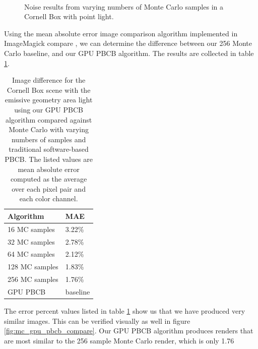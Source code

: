 \begin{figure}
   ~
   \captionfonts
   \caption[Monte Carlo noise]{Noise results from varying numbers of Monte Carlo samples in a Cornell Box with point light.}
   \label{fig:monte_carlo_noise}
\end{figure}

Using the mean absolute error image comparison algorithm implemented in ImageMagick compare \cite{bib:compare}, we can determine the difference between our 256 Monte Carlo baseline, and our GPU PBCB algorithm. The results are collected in table \ref{tbl:compare}.

\begin{table}[h!]
   \centering
   \begin{tabular}{ | l | l | }
   \hline
   \textbf{Algorithm} & \textbf{MAE} \\ \hline
   16 MC samples & 3.22\% \\ \hline
   32 MC samples & 2.78\% \\ \hline
   64 MC samples & 2.12\% \\ \hline
   128 MC samples & 1.83\% \\ \hline
   256 MC samples & 1.76\% \\ \hline
   GPU PBCB & baseline \\ \hline
   \end{tabular}
   \captionfonts
   \caption[Monte Carlo vs. GPU PBCB image comparison]{Image difference for the Cornell Box scene with the emissive geometry area light using our GPU PBCB algorithm compared against Monte Carlo with varying numbers of samples and traditional software-based PBCB. The listed values are mean absolute error computed as the average over each pixel pair and each color channel.}
   \label{tbl:compare}
\end{table}

The error percent values listed in table \ref{tbl:compare} show us that we have produced very similar images. This can be verified visually as well in figure \ref{fig:mc_gpu_pbcb_compare}. Our GPU PBCB algorithm produces renders that are most similar to the 256 sample Monte Carlo render, which is only 1.76%

